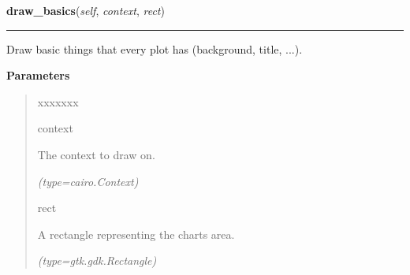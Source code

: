     \vspace{0.5ex}

\hspace{.8\funcindent}\begin{boxedminipage}{\funcwidth}

    \raggedright \textbf{draw\_basics}(\textit{self}, \textit{context}, \textit{rect})

    \vspace{-1.5ex}

    \rule{\textwidth}{0.5\fboxrule}
\setlength{\parskip}{2ex}
    Draw basic things that every plot has (background, title, ...).

\setlength{\parskip}{1ex}
      \textbf{Parameters}
      \vspace{-1ex}

      \begin{quote}
        \begin{Ventry}{xxxxxxx}

          \item[context]

          The context to draw on.

            {\it (type=cairo.Context)}

          \item[rect]

          A rectangle representing the charts area.

            {\it (type=gtk.gdk.Rectangle)}

        \end{Ventry}

      \end{quote}

    \end{boxedminipage}

    \vspace{0.5ex}


